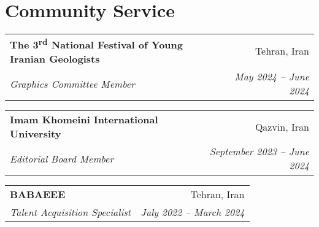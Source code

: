 \documentclass[letterpaper,11pt]{article}
\makeatletter
\newcommand{\ressubheading}[4]{%
	\begin{tabular*}{6.5in}{l@{\cftdotfill{\cftsecdotsep}\extracolsep{\fill}}r}
		\textbf{#1} & #2 \\
		\textit{#3} & \textit{#4} \\
	\end{tabular*}\vspace{-8pt}
}
\makeatother
\begin{document}
	\section{Community Service}
	\ressubheading{The 3\textsuperscript{rd} National Festival of Young Iranian Geologists}{Tehran, Iran}{Graphics Committee Member}{May 2024 – June 2024}
	
	\vspace{0.99em} 
	
	\ressubheading{Imam Khomeini International University}{Qazvin, Iran}{Editorial Board Member}{September 2023 – June 2024}
	
	\vspace{0.99em} 
	
	\ressubheading{BABAEEE}{Tehran, Iran}{Talent Acquisition Specialist}{July 2022 – March 2024}
	
	
	
\end{document}
